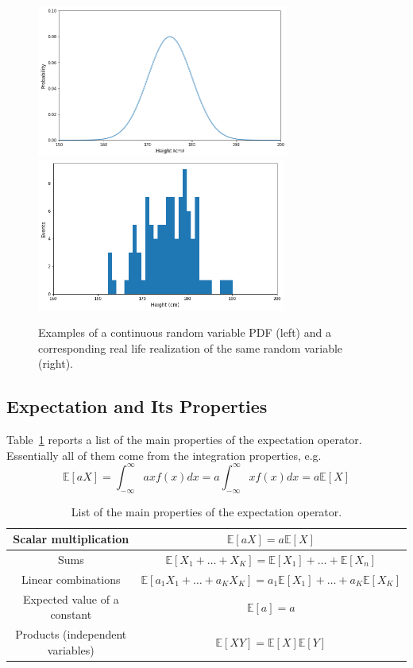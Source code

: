 \documentclass[12pt,a4paper]{book}
\begin{document}
\begin{figure}[htbp]
\begin{center}
\includegraphics[height=5cm]{continouos_random_variable}
\includegraphics[height=5cm]{real_data}
\caption{Examples of a continuous random variable PDF (left) and a corresponding real life realization of the same random variable (right).}
\label{fig:real_data}
\end{center}
\end{figure} 

\subsection{Expectation and Its Properties}
Table~\ref{tab:expectation_prop} reports a list of the main properties of the expectation operator.
Essentially all of them come from the integration properties, e.g.
\begin{equation*}
	\mathbb{E}[aX] = \int_{-\infty}^{\infty} ax f(x) dx = a  \int_{-\infty}^{\infty} x f(x) dx = a\mathbb{E}[X]
\end{equation*}

\renewcommand{\arraystretch}{1.4}
\begin{table}[hbt]
	\begin{center}
		\begin{tabular}{|c|c|} \hline
			Scalar multiplication & $\mathbb{E}[aX] = a\mathbb{E}[X]$ \\ \hline
			Sums & $\mathbb{E}[X_1+\ldots +X_K] =  \mathbb{E}[X_1] +\ldots + \mathbb{E}[X_n]$ \\ \hline
			Linear combinations & $\mathbb{E}[a_1X_1+\ldots +a_KX_K] =  a_1\mathbb{E}[X_1] +\ldots + a_K\mathbb{E}[X_K]$ \\ \hline
			Expected value of a constant & $\mathbb{E}[a] = a$ \\ \hline
			Products (independent variables) & $\mathbb{E}[XY] = \mathbb{E}[X] \mathbb{E}[Y]$ \\ \hline
		\end{tabular}
	\end{center}
\caption{List of the main properties of the expectation operator.}
\label{tab:expectation_prop}
\end{table}
\end{document}
